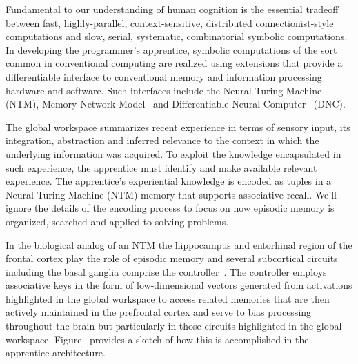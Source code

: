 
Fundamental to our understanding of human cognition is the essential tradeoff between fast, highly-parallel, context-sensitive, distributed connectionist-style computations and slow, serial, systematic, combinatorial symbolic computations. In developing the programmer's apprentice, symbolic computations of the sort common in conventional computing are realized using extensions that provide a differentiable interface to conventional memory and information processing hardware and software. Such interfaces include the Neural Turing Machine~\cite{GravesetalCoRR-14} (NTM), Memory Network Model~\cite{WestonetalCoRR-14,SukhbaataretalCoRR-15} and Differentiable Neural Computer~\cite{GravesetalNATURE-16} (DNC).

The global workspace summarizes recent experience in terms of sensory input, its integration, abstraction and inferred relevance to the context in which the underlying information was acquired. To exploit the knowledge encapsulated in such experience, the apprentice must identify and make available relevant experience. The apprentice’s experiential knowledge is encoded as tuples in a Neural Turing Machine (NTM) memory that supports associative recall. We’ll ignore the details of the encoding process to focus on how episodic memory is organized, searched and applied to solving problems.

In the biological analog of an NTM the hippocampus and entorhinal region of the frontal cortex play the role of episodic memory and several subcortical circuits including the basal ganglia comprise the controller~\cite{OReillyetalLEABRA-16,OReillySCIENCE-06}. The controller employs associative keys in the form of low-dimensional vectors generated from activations highlighted in the global workspace to access related memories that are then actively maintained in the prefrontal cortex and serve to bias processing throughout the brain but particularly in those circuits highlighted in the global workspace. Figure~{} provides a sketch of how this is accomplished in the apprentice architecture. 


\setcounter{figure}{51}



